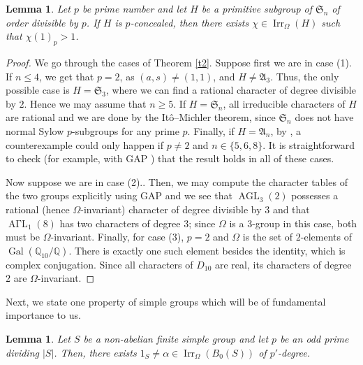 \documentclass[12pt]{amsart}
\theoremstyle{theorem}
\newtheorem{lem}[teo]{Lemma}
\theoremstyle{definition}
\newcommand{\fA} {\mathfrak A}
\newcommand{\fS} {\mathfrak S}
\newcommand{\Irr}{{\operatorname{Irr}}}
\newcommand{\AGL}{\operatorname{AGL}}
\newcommand{\AGaL}{\operatorname{A\Gamma L}}
\begin{document}
	\begin{lem}   \label{pconomega}
		Let $p$ be prime number and let $H$ be a primitive subgroup of $\fS_n$ of order
		divisible by $p$. If $H$ is $p$-concealed, then there exists $\chi\in\Irr_\Omega(H)$ such that
		$\chi(1)_p>1$.
	\end{lem}
	\begin{proof}
		We go through the cases of Theorem \ref{t2}. Suppose first we are in case (1). If $n\leq 4$, we get that $p=2$, as $(a, s) \neq (1, 1)$, and $H \neq \fA_3$. Thus, the only possible case is $H = \fS_3$, where we can find a rational character of degree divisible by $2$. Hence we may assume that $n\geq 5$. If $H=\fS_n$, all irreducible characters of $H$ are rational and we are done by the Itô--Michler theorem, since $\fS_n$ does not have normal Sylow $p$-subgroups for any prime $p$. Finally, if $H = \fA_n$, by \cite[Theorem 2.8]{MMRSF}, a counterexample could only happen if $p \neq 2$ and $n \in \{5, 6, 8\}$. It is straightforward to check (for example, with GAP \cite{gap}) that the result holds in all of these cases.
				
		Now suppose we are in case (2).. Then, we may compute the character tables of the two groups explicitly using GAP and we see that $\AGL_3(2)$ possesses a rational (hence $\Omega$-invariant) character of degree divisible by $3$ and that $\AGaL_1(8)$ has two characters of degree $3$; since $\Omega$ is a $3$-group in this case, both must be $\Omega$-invariant. Finally, for case (3), $p = 2$ and $\Omega$ is the set of $2$-elements of $\operatorname{Gal}(\mathbb{Q}_{10}/\mathbb{Q})$. There is exactly one such element besides the identity, which is complex conjugation. Since all characters of $D_{10}$ are real, its characters of degree $2$ are $\Omega$-invariant.
	\end{proof}
	
	Next, we state one property of simple groups which will be of fundamental importance to us.
	
	\begin{lem} \label{simpleGroupCondition}
		Let $S$ be a non-abelian finite simple group and let $p$ be an odd prime dividing $|S|$. Then, there exists $1_S \neq \alpha \in \Irr_\Omega(B_0(S))$ of $p'$-degree. 
	\end{lem}
	
\end{document}
